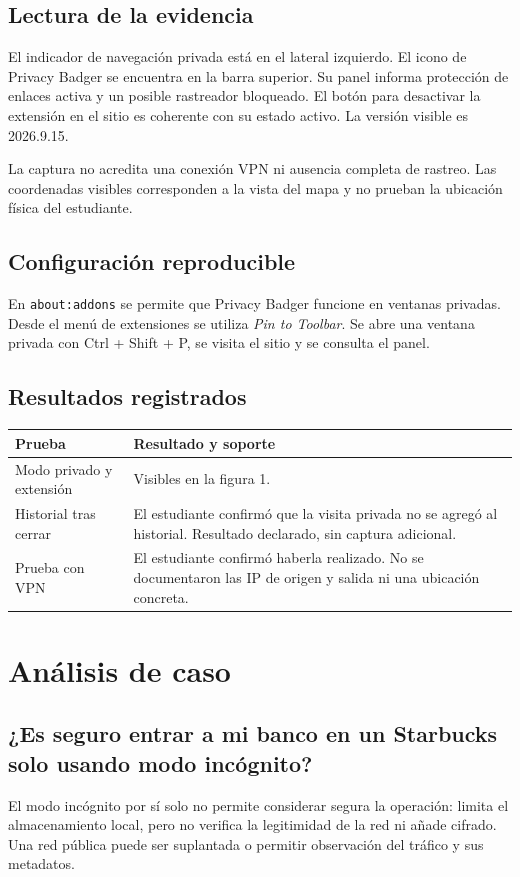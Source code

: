 \documentclass[11pt,a4paper]{article}
\begin{document}
\subsection{Lectura de la evidencia}
El indicador de navegación privada está en el lateral izquierdo. El icono de Privacy Badger se encuentra en la barra superior. Su panel informa protección de enlaces activa y un posible rastreador bloqueado. El botón para desactivar la extensión en el sitio es coherente con su estado activo. La versión visible es 2026.9.15.

La captura no acredita una conexión VPN ni ausencia completa de rastreo. Las coordenadas visibles corresponden a la vista del mapa y no prueban la ubicación física del estudiante.
\subsection{Configuración reproducible}
En \texttt{about:addons} se permite que Privacy Badger funcione en ventanas privadas. Desde el menú de extensiones se utiliza \textit{Pin to Toolbar}. Se abre una ventana privada con Ctrl + Shift + P, se visita el sitio y se consulta el panel.
\subsection{Resultados registrados}
\begin{tabularx}{\textwidth}{p{4cm}X}
\toprule\textbf{Prueba} & \textbf{Resultado y soporte}\\\midrule
Modo privado y extensión & Visibles en la figura 1.\\
Historial tras cerrar & El estudiante confirmó que la visita privada no se agregó al historial. Resultado declarado, sin captura adicional.\\
Prueba con VPN & El estudiante confirmó haberla realizado. No se documentaron las IP de origen y salida ni una ubicación concreta.\\\bottomrule
\end{tabularx}
\clearpage
\section{Análisis de caso}
\subsection{¿Es seguro entrar a mi banco en un Starbucks solo usando modo incógnito?}
El modo incógnito por sí solo no permite considerar segura la operación: limita el almacenamiento local, pero no verifica la legitimidad de la red ni añade cifrado. Una red pública puede ser suplantada o permitir observación del tráfico y sus metadatos.
\end{document}
